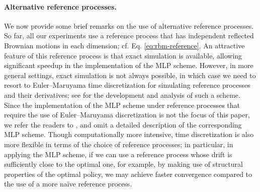 \documentclass[11pt]{article}
\theoremstyle{definition}
\theoremstyle{plain}
\begin{document}
\paragraph{Alternative reference processes.} We now provide some brief remarks on the use of alternative reference processes.
So far, all our experiments use a reference process that has independent reflected Brownian motions in each dimension; cf. Eq. \eqref{eq:rbm-reference}. 
An attractive feature of this reference process is that exact simulation is available, allowing significant speedup in the implementation of the MLP scheme. 
However, in more general settings, exact simulation is not always possible, in which case we need to resort to Euler--Maruyama time discretization 
for simulating reference processes and their derivatives; see \cite{LipshutzRamanan2019a} for the development and analysis of such a scheme. 
Since the implementation of the MLP scheme under reference processes that require the use of Euler--Maruyama discretization is not the focus 
of this paper, we refer the readers to \cite{LipshutzRamanan2019a}, and omit a detailed description of the corresponding MLP scheme. 
Though computationally more intensive, time discretization is also more flexible in terms of the choice of reference processes; 
in particular, in applying the MLP scheme, if we can use a reference process whose drift is sufficiently close to the optimal one, 
for example, by making use of structural properties of the optimal policy, 
we may achieve faster convergence compared to the use of a more naïve reference process. 
\end{document}
